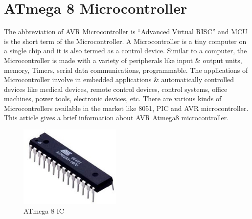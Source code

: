 \documentclass[twoside,a4paper,16pt]{book}
\begin{document}
{{\section{ATmega 8 Microcontroller }
The abbreviation of AVR Microcontroller is “Advanced Virtual RISC” and MCU is the short term of the Microcontroller. A Microcontroller is a tiny computer on a single chip and it is also termed as a control device. Similar to a computer, the Microcontroller is made with a variety of peripherals like input \& output units, memory, Timers, serial data communications, programmable. The applications of Microcontroller involve in embedded applications \& automatically controlled devices like medical devices, remote control devices, control systems, office machines, power tools, electronic devices, etc. There are various kinds of Microcontrollers available in the market like 8051, PIC and AVR microcontroller. This article gives a brief information about AVR Atmega8 microcontroller.
\begin{figure}[ht!]
	\begin{center}
		\includegraphics[width=5.0cm]{8.jpg}
		\caption{ATmega 8 IC}
	\end{center}
\end{figure}
}}
\end{document}
